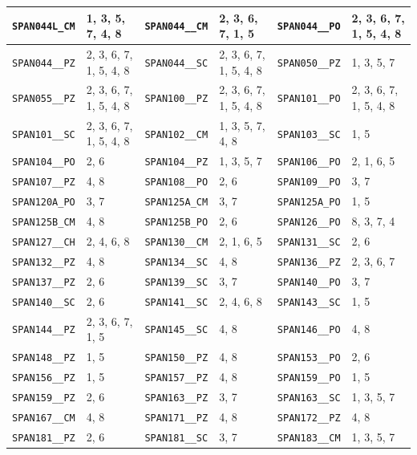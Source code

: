 \begin{longtable}{|l|l||l|l||l|l|}
    \verb|SPAN044L_CM| & 1, 3, 5, 7, 4, 8 & \verb|SPAN044__CM| & 2, 3, 6, 7, 1, 5 & \verb|SPAN044__PO| & 2, 3, 6, 7, 1, 5, 4, 8\\\hline
    \verb|SPAN044__PZ| & 2, 3, 6, 7, 1, 5, 4, 8 & \verb|SPAN044__SC| & 2, 3, 6, 7, 1, 5, 4, 8 & \verb|SPAN050__PZ| & 1, 3, 5, 7\\\hline
    \verb|SPAN055__PZ| & 2, 3, 6, 7, 1, 5, 4, 8 & \verb|SPAN100__PZ| & 2, 3, 6, 7, 1, 5, 4, 8 & \verb|SPAN101__PO| & 2, 3, 6, 7, 1, 5, 4, 8\\\hline
    \verb|SPAN101__SC| & 2, 3, 6, 7, 1, 5, 4, 8 & \verb|SPAN102__CM| & 1, 3, 5, 7, 4, 8 & \verb|SPAN103__SC| & 1, 5\\\hline
    \verb|SPAN104__PO| & 2, 6 & \verb|SPAN104__PZ| & 1, 3, 5, 7 & \verb|SPAN106__PO| & 2, 1, 6, 5\\\hline
    \verb|SPAN107__PZ| & 4, 8 & \verb|SPAN108__PO| & 2, 6 & \verb|SPAN109__PO| & 3, 7\\\hline
    \verb|SPAN120A_PO| & 3, 7 & \verb|SPAN125A_CM| & 3, 7 & \verb|SPAN125A_PO| & 1, 5\\\hline
    \verb|SPAN125B_CM| & 4, 8 & \verb|SPAN125B_PO| & 2, 6 & \verb|SPAN126__PO| & 8, 3, 7, 4\\\hline
    \verb|SPAN127__CH| & 2, 4, 6, 8 & \verb|SPAN130__CM| & 2, 1, 6, 5 & \verb|SPAN131__SC| & 2, 6\\\hline
    \verb|SPAN132__PZ| & 4, 8 & \verb|SPAN134__SC| & 4, 8 & \verb|SPAN136__PZ| & 2, 3, 6, 7\\\hline
    \verb|SPAN137__PZ| & 2, 6 & \verb|SPAN139__SC| & 3, 7 & \verb|SPAN140__PO| & 3, 7\\\hline
    \verb|SPAN140__SC| & 2, 6 & \verb|SPAN141__SC| & 2, 4, 6, 8 & \verb|SPAN143__SC| & 1, 5\\\hline
    \verb|SPAN144__PZ| & 2, 3, 6, 7, 1, 5 & \verb|SPAN145__SC| & 4, 8 & \verb|SPAN146__PO| & 4, 8\\\hline
    \verb|SPAN148__PZ| & 1, 5 & \verb|SPAN150__PZ| & 4, 8 & \verb|SPAN153__PO| & 2, 6\\\hline
    \verb|SPAN156__PZ| & 1, 5 & \verb|SPAN157__PZ| & 4, 8 & \verb|SPAN159__PO| & 1, 5\\\hline
    \verb|SPAN159__PZ| & 2, 6 & \verb|SPAN163__PZ| & 3, 7 & \verb|SPAN163__SC| & 1, 3, 5, 7\\\hline
    \verb|SPAN167__CM| & 4, 8 & \verb|SPAN171__PZ| & 4, 8 & \verb|SPAN172__PZ| & 4, 8\\\hline
    \verb|SPAN181__PZ| & 2, 6 & \verb|SPAN181__SC| & 3, 7 & \verb|SPAN183__CM| & 1, 3, 5, 7\\\hline

\end{longtable}
